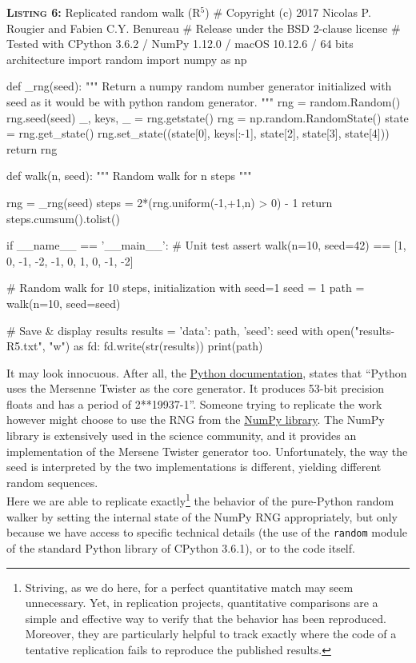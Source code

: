 \documentclass[a4paper,11pt]{article}
\begin{document}
\noindent \begin{minipage}[c]{\linewidth}
\begin{code}{\textbf{\textsc{Listing 6:}} Replicated random walk (R$^5$)}
# Copyright (c) 2017 Nicolas P. Rougier and Fabien C.Y. Benureau
# Release under the BSD 2-clause license
# Tested with CPython 3.6.2 / NumPy 1.12.0 / macOS 10.12.6 / 64 bits architecture
import random
import numpy as np

def _rng(seed):
    """ Return a numpy random number generator initialized with seed
        as it would be with python random generator.
    """
    rng = random.Random()
    rng.seed(seed)
    _, keys, _ = rng.getstate()
    rng = np.random.RandomState()
    state = rng.get_state()
    rng.set_state((state[0], keys[:-1], state[2], state[3], state[4]))
    return rng

def walk(n, seed):
    """ Random walk for n steps """

    rng = _rng(seed)
    steps = 2*(rng.uniform(-1,+1,n) > 0) - 1
    return steps.cumsum().tolist()

if __name__ == '__main__':
    # Unit test
    assert walk(n=10, seed=42) == [1, 0, -1, -2, -1, 0, 1, 0, -1, -2]

    # Random walk for 10 steps, initialization with seed=1
    seed = 1
    path = walk(n=10, seed=seed)

    # Save & display results
    results = {'data': path, 'seed': seed}
    with open("results-R5.txt", "w") as fd:
        fd.write(str(results))
    print(path)
\end{code}
\end{minipage}

It may look innocuous. After all, the
\href{https://docs.python.org/3.6/library/random.html}{Python documentation},
states that \enquote{Python uses the Mersenne Twister as the core generator. It produces
53-bit precision floats and has a period of 2**19937-1}. Someone trying to replicate the work however might choose to use the RNG from the \href{http://www.numpy.org/}{NumPy library}.  The NumPy library is extensively used in the science community, and it provides an implementation of the Mersene Twister generator too. Unfortunately, the way the seed is interpreted by the two implementations is different, yielding different random sequences.\\

Here we are able to replicate exactly\footnote{Striving, as we do here, for a perfect quantitative match may seem unnecessary. Yet, in replication projects, quantitative comparisons are a simple and effective way to verify that the behavior has been reproduced. Moreover, they are particularly helpful to track exactly where the code of a tentative replication fails to reproduce the published results.} the behavior of the pure-Python random walker by setting the internal state of the NumPy RNG appropriately, but only because we have access to specific technical details (the use of the {\tt random} module of the standard Python library of CPython 3.6.1), or to the code itself.\\
\end{document}
